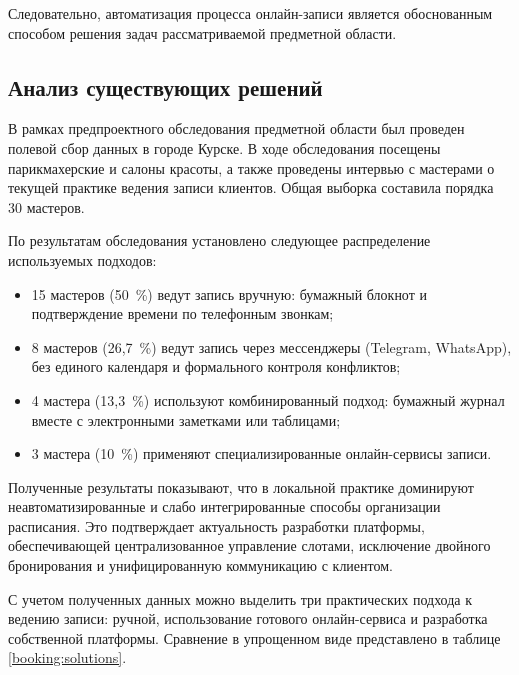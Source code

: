 Следовательно, автоматизация процесса онлайн-записи является обоснованным способом решения задач рассматриваемой предметной области.

\subsection{Анализ существующих решений}

В рамках предпроектного обследования предметной области был проведен полевой сбор данных в городе Курске. В ходе обследования посещены парикмахерские и салоны красоты, а также проведены интервью с мастерами о текущей практике ведения записи клиентов. Общая выборка составила порядка 30 мастеров.

По результатам обследования установлено следующее распределение используемых подходов:
\begin{itemize}
\item 15 мастеров (50~\%) ведут запись вручную: бумажный блокнот и подтверждение времени по телефонным звонкам;
\item 8 мастеров (26,7~\%) ведут запись через мессенджеры (Telegram, WhatsApp), без единого календаря и формального контроля конфликтов;
\item 4 мастера (13,3~\%) используют комбинированный подход: бумажный журнал вместе с электронными заметками или таблицами;
\item 3 мастера (10~\%) применяют специализированные онлайн-сервисы записи.
\end{itemize}

Полученные результаты показывают, что в локальной практике доминируют неавтоматизированные и слабо интегрированные способы организации расписания. Это подтверждает актуальность разработки платформы, обеспечивающей централизованное управление слотами, исключение двойного бронирования и унифицированную коммуникацию с клиентом.

С учетом полученных данных можно выделить три практических подхода к ведению записи: ручной, использование готового онлайн-сервиса и разработка собственной платформы. Сравнение в упрощенном виде представлено в таблице \ref{booking:solutions}.

